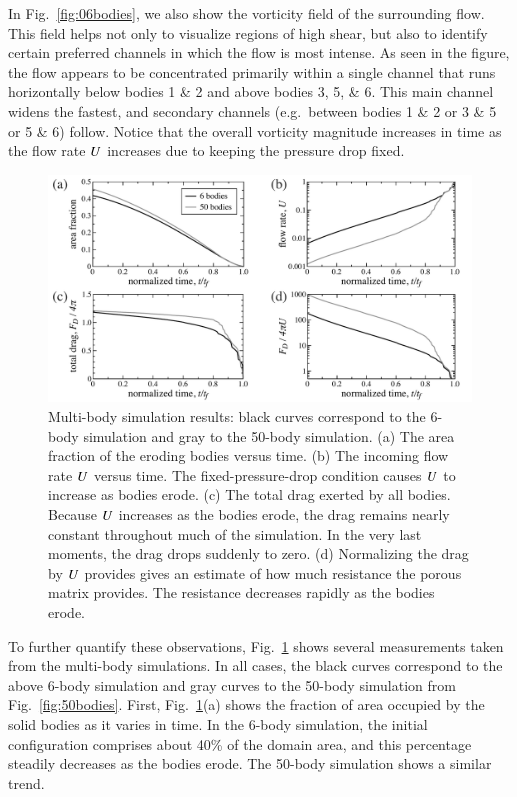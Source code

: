 \documentclass[preprint, 10pt]{elsarticle}
\begin{document}
In Fig.~\ref{fig:06bodies}, we also show the vorticity field of the surrounding flow. This field helps not only to visualize regions of high shear, but also to identify certain preferred channels in which the flow is most intense.  As seen in the figure, the flow appears to be concentrated primarily within a single channel that runs horizontally below bodies 1 \& 2 and above bodies 3, 5, \& 6. This main channel widens the fastest, and secondary channels (e.g.~between bodies 1 \& 2 or 3 \& 5 or 5 \& 6) follow. Notice that the overall vorticity magnitude increases in time as the flow rate $U$ increases due to keeping the pressure drop fixed.

\begin{figure}%
\begin{center}
\includegraphics[width = 0.90 \textwidth]{./figs/mbodyplots.pdf}
\caption{\label{fig:mbodyplots} 
Multi-body simulation results: black curves correspond to the 6-body simulation and gray to the 50-body simulation. (a) The area fraction of the eroding bodies versus time. (b) The incoming flow rate $U$ versus time. The fixed-pressure-drop condition causes $U$ to increase as bodies erode. (c) The total drag exerted by all bodies. Because $U$ increases as the bodies erode, the drag remains nearly constant throughout much of the simulation. In the very last moments, the drag drops suddenly to zero. (d) Normalizing the drag by $U$ provides gives an estimate of how much resistance the porous matrix provides. The resistance decreases rapidly as the bodies erode.
}
\end{center}
\end{figure}

To further quantify these observations, Fig.~\ref{fig:mbodyplots} shows several measurements taken from the multi-body simulations. In all cases, the black curves correspond to the above 6-body simulation and gray curves to the 50-body simulation from Fig.~\ref{fig:50bodies}. First, Fig.~\ref{fig:mbodyplots}(a) shows the fraction of area occupied by the solid bodies as it varies in time. In the 6-body simulation, the initial configuration comprises about 40\% of the domain area, and this percentage steadily decreases as the bodies erode. The 50-body simulation shows a similar trend. 
\end{document}

